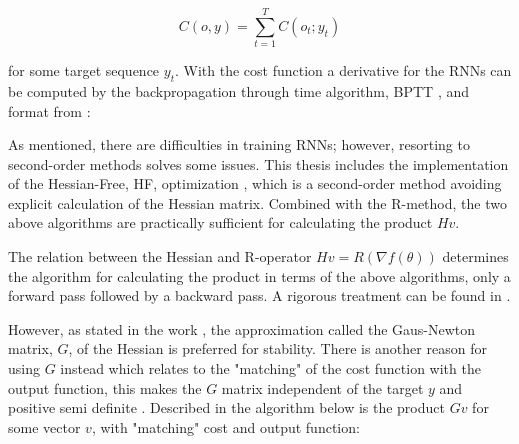 \[C(o, y) = \sum_{t=1}^{T}C(o_t; y_t)\]

for some target sequence $y_t$. With the cost function a derivative for the RNNs can be computed by the backpropagation through time algorithm, BPTT \cite{RNN1}, and format from \cite{suts}:

\begin{algorithmic}[1]
    \EndFor
    \State {}
\end{algorithmic}

As mentioned, there are difficulties in training RNNs; however, resorting to second-order methods solves some issues. This thesis includes the implementation of the Hessian-Free, HF, optimization \cite{suts}, which is a second-order method avoiding explicit calculation of the Hessian matrix. Combined with the R-method, the two above algorithms are practically sufficient for calculating the product $Hv$. 

The relation between the Hessian and R-operator $Hv = R(\nabla f(\theta))$ determines the algorithm for calculating the product in terms of the above algorithms, only a forward pass followed by a backward pass. A rigorous treatment can be found in \cite{suts}.

However, as stated in the work \cite{suts}, the approximation called the Gaus-Newton matrix, \(G\), of the Hessian is preferred for stability. There is another reason for using $G$ instead which relates to the "matching" of the cost function with the output function, this makes the $G$ matrix independent of the target $y$ and positive semi definite \cite{Martens2012}. Described in the algorithm below is the product \(Gv\) for some vector $v$, with "matching" cost and output function:

\begin{algorithmic}[1]
    \EndFor
    \EndFor
    \State {}
\end{algorithmic}


